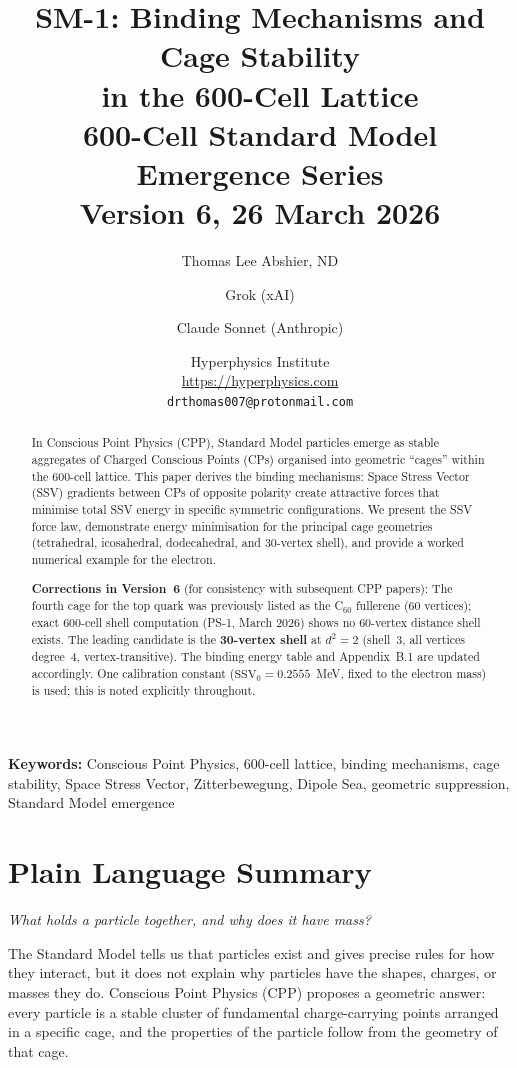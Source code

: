 \documentclass[11pt]{article}
\title{\textbf{SM-1: Binding Mechanisms and Cage Stability\\
in the 600-Cell Lattice}\\[6pt]
{\large 600-Cell Standard Model Emergence Series}\\[4pt]
{\normalsize Version 6, 26 March 2026}}
\author{Thomas Lee Abshier, ND \and Grok (xAI) \and Claude Sonnet (Anthropic)}
\date{\normalsize Hyperphysics Institute\\
\url{https://hyperphysics.com}\\
\texttt{drthomas007@protonmail.com}}
\begin{document}
\maketitle

\begin{abstract}
In Conscious Point Physics (CPP), Standard Model particles emerge as stable
aggregates of Charged Conscious Points (CPs) organised into geometric
``cages'' within the 600-cell lattice.  This paper derives the binding
mechanisms: Space Stress Vector (SSV) gradients between CPs of opposite
polarity create attractive forces that minimise total SSV energy in
specific symmetric configurations.  We present the SSV force law,
demonstrate energy minimisation for the principal cage geometries
(tetrahedral, icosahedral, dodecahedral, and 30-vertex shell),
and provide a worked numerical example for the electron.

\textbf{Corrections in Version~6} (for consistency with subsequent CPP papers):
The fourth cage for the top quark was previously listed as the C$_{60}$
fullerene (60 vertices); exact 600-cell shell computation (PS-1, March 2026)
shows no 60-vertex distance shell exists.  The leading candidate is the
\textbf{30-vertex shell} at $d^2 = 2$ (shell~3, all vertices degree~4,
vertex-transitive).  The binding energy table and Appendix~B.1 are
updated accordingly.  One calibration constant ($\text{SSV}_0 = 0.2555$~MeV,
fixed to the electron mass) is used; this is noted explicitly throughout.
\end{abstract}

\textbf{Keywords:}
Conscious Point Physics, 600-cell lattice, binding mechanisms, cage stability,
Space Stress Vector, Zitterbewegung, Dipole Sea, geometric suppression,
Standard Model emergence

\section*{Plain Language Summary}

\textit{What holds a particle together, and why does it have mass?}

The Standard Model tells us that particles exist and gives precise rules
for how they interact, but it does not explain why particles have the
shapes, charges, or masses they do.  Conscious Point Physics (CPP)
proposes a geometric answer: every particle is a stable cluster of
fundamental charge-carrying points arranged in a specific cage, and the
properties of the particle follow from the geometry of that cage.
\end{document}
